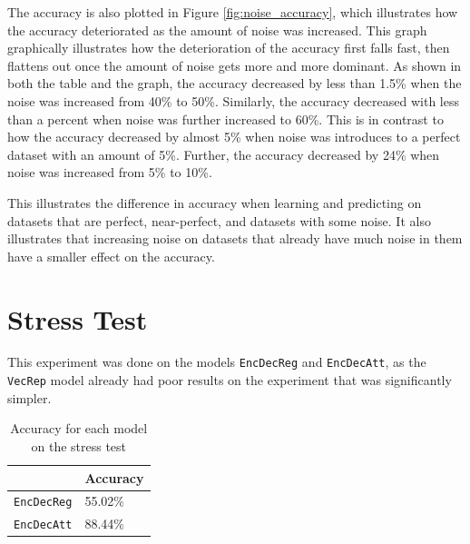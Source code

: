 The accuracy is also plotted in Figure \ref{fig:noise_accuracy}, which illustrates how the accuracy deteriorated as the amount of noise was increased. This graph graphically illustrates how the deterioration of the accuracy first falls fast, then flattens out once the amount of noise gets more and more dominant. As shown in both the table and the graph, the accuracy decreased by less than 1.5\% when the noise was increased from 40\% to 50\%. Similarly, the accuracy decreased with less than a percent when noise was further increased to 60\%. This is in contrast to how the accuracy decreased by almost 5\% when noise was introduces to a perfect dataset with an amount of 5\%. Further, the accuracy decreased by 24\% when noise was increased from 5\% to 10\%.

This illustrates the difference in accuracy when learning and predicting on datasets that are perfect, near-perfect, and datasets with some noise. It also illustrates that increasing noise on datasets that already have much noise in them have a smaller effect on the accuracy.


\section{Stress Test}
\label{sec:stress_test}
This experiment was done on the models {\tt EncDecReg} and {\tt EncDecAtt}, as the {\tt VecRep} model already had poor results on the experiment that was significantly simpler.

\begin{table}[H]
    \centering
    \begin{tabular}{|l|l|}
        \hline 
                                        & \textbf{Accuracy}         \\ \hline
        {\tt EncDecReg}                 & 55.02\%                   \\ \hline
        {\tt EncDecAtt}                 & 88.44\%                   \\ \hline
    \end{tabular}
    \caption{Accuracy for each model on the stress test}
    \label{table:accuracy_stress_test}
\end{table}

